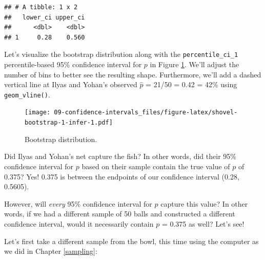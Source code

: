 \documentclass[
]{book}
\newenvironment{Shaded}{\begin{snugshade}}{\end{snugshade}}
\newcommand{\DataTypeTok}[1]{\textcolor[rgb]{0.13,0.29,0.53}{#1}}
\newcommand{\DecValTok}[1]{\textcolor[rgb]{0.00,0.00,0.81}{#1}}
\newcommand{\FloatTok}[1]{\textcolor[rgb]{0.00,0.00,0.81}{#1}}
\newcommand{\KeywordTok}[1]{\textcolor[rgb]{0.13,0.29,0.53}{\textbf{#1}}}
\newcommand{\NormalTok}[1]{#1}
\newcommand{\OperatorTok}[1]{\textcolor[rgb]{0.81,0.36,0.00}{\textbf{#1}}}
\newcommand{\StringTok}[1]{\textcolor[rgb]{0.31,0.60,0.02}{#1}}
\begin{document}
\begin{verbatim}
## # A tibble: 1 x 2
##   lower_ci upper_ci
##      <dbl>    <dbl>
## 1     0.28    0.560
\end{verbatim}

Let's visualize the bootstrap distribution along with the \texttt{percentile\_ci\_1} percentile-based 95\% confidence interval for \(p\) in Figure \ref{fig:shovel-bootstrap-1-infer}. We'll adjust the number of bins to better see the resulting shape. Furthermore, we'll add a dashed vertical line at Ilyas and Yohan's observed \(\widehat{p}\) = 21/50 = 0.42 = 42\% using \texttt{geom\_vline()}.

\begin{Shaded}
\end{Shaded}

\begin{figure}
\centering
\texttt{[image: 09-confidence-intervals\_files/figure-latex/shovel-bootstrap-1-infer-1.pdf]}
\caption{\label{fig:shovel-bootstrap-1-infer}Bootstrap distribution.}
\end{figure}

Did Ilyas and Yohan's net capture the fish? In other words, did their 95\% confidence interval for \(p\) based on their sample contain the true value of \(p\) of 0.375? Yes! 0.375 is between the endpoints of our confidence interval (0.28, 0.5605).

However, will \emph{every} 95\% confidence interval for \(p\) capture this value? In other words, if we had a different sample of 50 balls and constructed a different confidence interval, would it necessarily contain \(p\) = 0.375 as well? Let's see!

Let's first take a different sample from the bowl, this time using the computer as we did in Chapter \ref{sampling}:

\begin{Shaded}
\end{Shaded}
\end{document}

